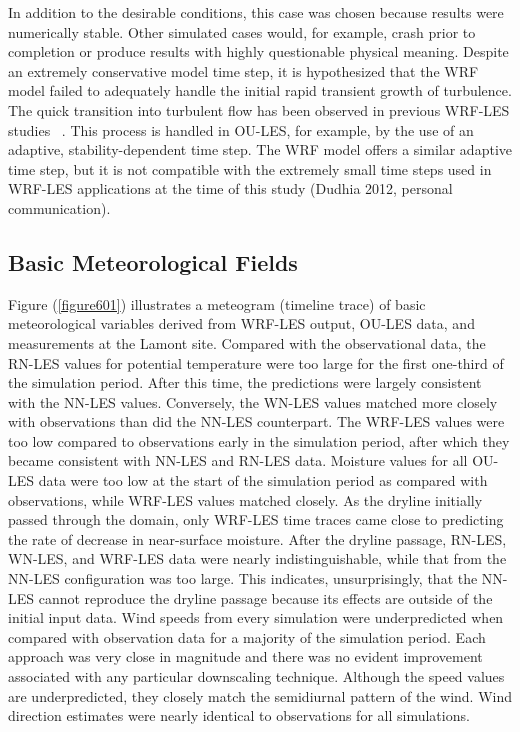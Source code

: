 In addition to the desirable conditions, this case was chosen because results were numerically stable. Other simulated cases would, for example, crash prior to completion or produce results with highly questionable physical meaning. Despite an extremely conservative model time step, it is hypothesized that the WRF model failed to adequately handle the initial rapid transient growth of turbulence. The quick transition into turbulent flow has been observed in previous WRF-LES studies ~\citep{Talbot2012}. This process is handled in OU-LES, for example, by the use of an adaptive, stability-dependent time step. The WRF model offers a similar adaptive time step, but it is not compatible with the extremely small time steps used in WRF-LES applications at the time of this study (Dudhia 2012, personal communication).

\subsection{Basic Meteorological Fields}
\label{basic-621}

Figure (\autoref{figure601}) illustrates a meteogram (timeline trace) of basic meteorological variables derived from WRF-LES output, OU-LES data, and measurements at the Lamont site. Compared with the observational data, the RN-LES values for potential temperature were too large for the first one-third of the simulation period. After this time, the predictions were largely consistent with the NN-LES values. Conversely, the WN-LES values matched more closely with observations than did the NN-LES counterpart. The WRF-LES values were too low compared to observations early in the simulation period, after which they became consistent with NN-LES and RN-LES data. Moisture values for all OU-LES data were too low at the start of the simulation period as compared with observations, while WRF-LES values matched closely. As the dryline initially passed through the domain, only WRF-LES time traces came close to predicting the rate of decrease in near-surface moisture. After the dryline passage, RN-LES, WN-LES, and WRF-LES data were nearly indistinguishable, while that from the NN-LES configuration was too large. This indicates, unsurprisingly, that the NN-LES cannot reproduce the dryline passage because its effects are outside of the initial input data. Wind speeds from every simulation were underpredicted when compared with observation data for a majority of the simulation period. Each approach was very close in magnitude and there was no evident improvement associated with any particular downscaling technique. Although the speed values are underpredicted, they closely match the semidiurnal pattern of the wind. Wind direction estimates were nearly identical to observations for all simulations.


